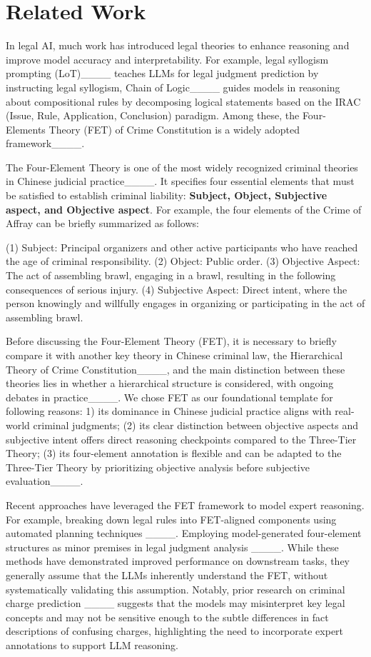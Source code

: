 \section{Related Work}
In legal AI, much work has introduced legal theories to enhance reasoning and improve model accuracy and interpretability. For example, legal syllogism prompting (LoT)____ teaches LLMs for legal judgment prediction by instructing legal syllogism, Chain of Logic____ guides models in reasoning about compositional rules by decomposing logical statements based on the IRAC (Issue, Rule, Application, Conclusion) paradigm.  Among these, the Four-Elements Theory (FET) of Crime Constitution is a widely adopted framework____.

The Four-Element Theory is one of the most widely recognized criminal theories in Chinese judicial practice____. It specifies four essential elements that must be satisfied to establish criminal liability: \textbf{Subject, Object, Subjective aspect, and Objective aspect}. For example, the four elements of the Crime of Affray can be briefly summarized as follows:

(1) Subject: Principal organizers and other active participants who have reached the age of criminal responsibility. (2) Object: Public order. (3) Objective Aspect: The act of assembling brawl, engaging in a brawl, resulting in the following consequences of serious injury. (4) Subjective Aspect: Direct intent, where the person knowingly and willfully engages in organizing or participating in the act of assembling brawl.

Before discussing the Four-Element Theory (FET), it is necessary to briefly compare it with another key theory in Chinese criminal law, the Hierarchical Theory of Crime Constitution____, and the main distinction between these theories lies in whether a hierarchical structure is considered, with ongoing debates in practice____. We chose FET as our foundational template for following reasons: 1) its dominance in Chinese judicial practice aligns with real-world criminal judgments; (2) its clear distinction between objective aspects and subjective intent offers direct reasoning checkpoints compared to the Three-Tier Theory; (3) its four-element annotation is flexible and can be adapted to the Three-Tier Theory by prioritizing objective analysis before subjective evaluation____.

Recent approaches have leveraged the FET framework to model expert reasoning. For example, breaking down legal rules into FET-aligned components using automated planning techniques ____. Employing model-generated four-element structures as minor premises in legal judgment analysis ____. While these methods have demonstrated improved performance on downstream tasks, they generally assume that the LLMs inherently understand the FET, without systematically validating this assumption. Notably, prior research on criminal charge prediction ____ suggests that the models may misinterpret key legal concepts and may not be sensitive enough to the subtle differences in fact descriptions of confusing charges, highlighting the need to incorporate expert annotations to support LLM reasoning.